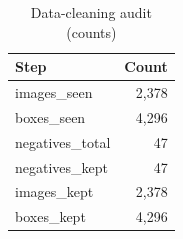 \begin{table}[t]\centering\caption{Data-cleaning audit (counts)}\label{tab:clean}
\begin{tabular}{lr}\toprule Step & Count \\ \midrule
images\_seen & 2,378 \\
boxes\_seen & 4,296 \\
negatives\_total & 47 \\
negatives\_kept & 47 \\
images\_kept & 2,378 \\
boxes\_kept & 4,296 \\
\bottomrule\end{tabular}\end{table}
